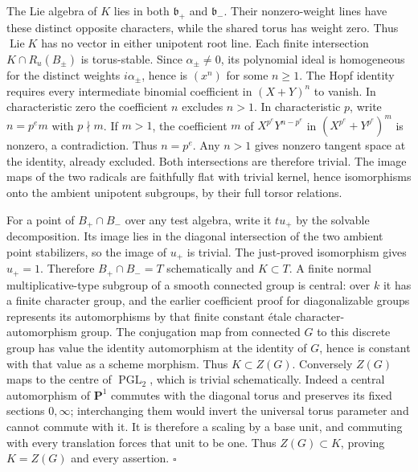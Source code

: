 \documentclass[11pt,a4paper,openany]{report}
\begin{document}
The Lie algebra of \(K\) lies in both \(\mathfrak b_+\) and \(\mathfrak b_-\). Their nonzero-weight lines have these distinct opposite characters, while the shared torus has weight zero. Thus \(\operatorname{Lie}K\) has no vector in either unipotent root line. Each finite intersection \(K\cap R_u(B_\pm)\) is torus-stable. Since \(\alpha_\pm\ne0\), its polynomial ideal is homogeneous for the distinct weights \(i\alpha_\pm\), hence is \((x^n)\) for some \(n\ge1\). The Hopf identity requires every intermediate binomial coefficient in \((X+Y)^n\) to vanish. In characteristic zero the coefficient \(n\) excludes \(n>1\). In characteristic \(p\), write \(n=p^e m\) with \(p\nmid m\). If \(m>1\), the coefficient \(m\) of \(X^{p^e}Y^{n-p^e}\) in \((X^{p^e}+Y^{p^e})^m\) is nonzero, a contradiction. Thus \(n=p^e\). Any \(n>1\) gives nonzero tangent space at the identity, already excluded. Both intersections are therefore trivial. The image maps of the two radicals are faithfully flat with trivial kernel, hence isomorphisms onto the ambient unipotent subgroups, by their full torsor relations.

For a point of \(B_+\cap B_-\) over any test algebra, write it \(tu_+\) by the solvable decomposition. Its image lies in the diagonal intersection of the two ambient point stabilizers, so the image of \(u_+\) is trivial. The just-proved isomorphism gives \(u_+=1\). Therefore \(B_+\cap B_-=T\) schematically and \(K\subset T\). A finite normal multiplicative-type subgroup of a smooth connected group is central: over \(k\) it has a finite character group, and the earlier coefficient proof for diagonalizable groups represents its automorphisms by that finite constant étale character-automorphism group. The conjugation map from connected \(G\) to this discrete group has value the identity automorphism at the identity of \(G\), hence is constant with that value as a scheme morphism. Thus \(K\subset Z(G)\). Conversely \(Z(G)\) maps to the centre of \(\operatorname{PGL}_2\), which is trivial schematically. Indeed a central automorphism of \(\mathbf P^1\) commutes with the diagonal torus and preserves its fixed sections \(0,\infty\); interchanging them would invert the universal torus parameter and cannot commute with it. It is therefore a scaling by a base unit, and commuting with every translation forces that unit to be one. Thus \(Z(G)\subset K\), proving \(K=Z(G)\) and every assertion. \(\square\)
\end{document}

